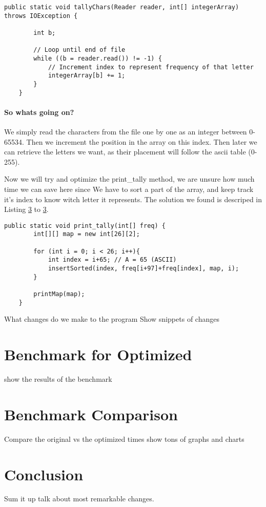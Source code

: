 \documentclass{article}
\begin{document}
\begin{lstlisting}[caption={Change to BufferedReader}, label={lst:optimizationone}]
    public static void tallyChars(Reader reader, int[] integerArray) throws IOException {
        
        int b;

        // Loop until end of file
        while ((b = reader.read()) != -1) {
            // Increment index to represent frequency of that letter 
            integerArray[b] += 1;
        }
    }
\end{lstlisting}

\paragraph{So whats going on?} We simply read the characters from the file one by one as an integer between 0-65534. 
Then we increment the position in the array on this index. Then later we can retrieve the letters we want, as their 
placement will follow the ascii table (0-255). 

Now we will try and optimize the print\_tally method, we are unsure how much time we can save here since
We have to sort a part of the array, and keep track it's index to know witch letter it represents. 
The solution we found is descriped in Listing \ref{} to \ref{}. 

\begin{lstlisting}[caption={Change to BufferedReader}, label={lst:optimizationone}]
    public static void print_tally(int[] freq) {
        int[][] map = new int[26][2];

        for (int i = 0; i < 26; i++){
            int index = i+65; // A = 65 (ASCII) 
            insertSorted(index, freq[i+97]+freq[index], map, i);
        }

        printMap(map);
    }
\end{lstlisting}



What changes do we make to the program
Show snippets of changes

\section{Benchmark for Optimized}
show the results of the benchmark

\section{Benchmark Comparison}
Compare the original vs the optimized times
show tons of graphs and charts

\section{Conclusion}
Sum it up 
talk about most remarkable changes.
\end{document}

